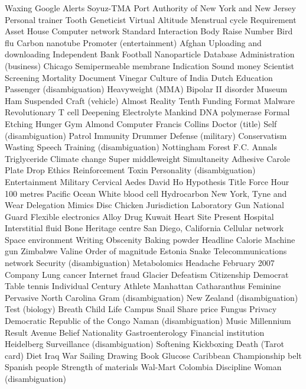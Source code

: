 Waxing  Google Alerts  Soyuz-TMA  
Port Authority of New York and New Jersey  Personal trainer  Tooth  
Geneticist  Virtual  Altitude  
Menstrual cycle  Requirement  Asset  
House  Computer network  Standard  
Interaction  Body  Raise  
Number  Bird flu  Carbon nanotube  
Promoter (entertainment)  Afghan  Uploading and downloading  
Independent Bank  Football  Nanoparticle  
Database  Administration (business)  Chicago  
Semipermeable membrane  Indication  Sound money  
Scientist  Screening  Mortality  
Document  Vinegar  Culture of India  
Dutch  Education  Passenger (disambiguation)  
Heavyweight (MMA)  Bipolar II disorder  Museum  
Ham  Suspended  Craft (vehicle)  
Almost  Reality  Tenth  
Funding  Format  Malware  
Revolutionary  T cell  Deepening  
Electrolyte  Mankind  DNA polymerase  
Formal  Etching  Hunger  
Gym  Almond  Computer  
Francis Collins  Doctor (title)  Self (disambiguation)  
Patrol  Immunity  Drummer  
Defense (military)  Conservatism  Wasting  
Speech  Training (disambiguation)  Nottingham Forest F.C.  
Annals  Triglyceride  Climate change  
Super middleweight  Simultaneity  Adhesive  
Carole  Plate  Drop  
Ethics  Reinforcement  Toxin  
Personality (disambiguation)  Entertainment  Military  
Cervical  Aedes  David Ho  
Hypothesis  Title  Force  
Hour  100 metres  Pacific Ocean  
White blood cell  Hydrocarbon  New York, Tyne and Wear  
Delegation  Mimics  Disc  
Chicken  Jurisdiction  Laboratory  
Gun  National Guard  Flexible electronics  
Alloy  Drug  Kuwait  
Heart  Site  Present  
Hospital  Interstitial fluid  Bone  
Heritage centre  San Diego, California  Cellular network  
Space environment  Writing  Obscenity  
Baking powder  Headline  Calorie  
Machine gun  Zimbabwe  Valine  
Order of magnitude  Estonia  Snake  
Telecommunications network  Security (disambiguation)  Metabolomics  
Headache  February 2007  Company  
Lung cancer  Internet fraud  Glacier  
Defeatism  Citizenship  Democrat  
Table tennis  Individual  Century  
Athlete  Manhattan  Catharanthus  
Feminine  Pervasive  North Carolina  
Gram (disambiguation)  New Zealand (disambiguation)  Test (biology)  
Breath  Child  Life  
Campus  Snail  Share price  
Fungus  Privacy  Democratic Republic of the Congo  
Naman (disambiguation)  Music Millennium  Result  
Avenue  Belief  Nationality  
Gastroenterology  Financial institution  Heidelberg  
Surveillance (disambiguation)  Softening  Kickboxing  
Death (Tarot card)  Diet  Iraq War  
Sailing  Drawing  Book  
Glucose  Caribbean  Championship belt  
Spanish people  Strength of materials  Wal-Mart  
Colombia  Discipline  Woman (disambiguation)  
